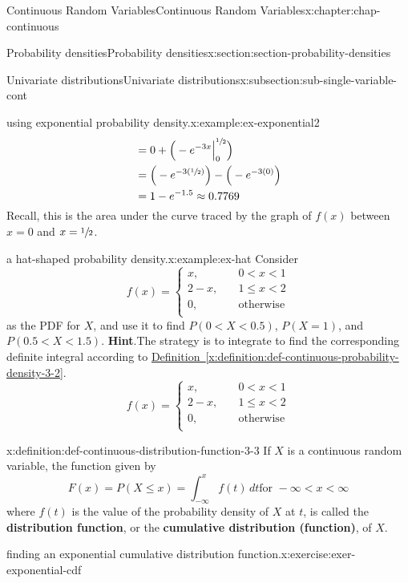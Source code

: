 \documentclass[oneside,10pt,]{book}
\newcommand{\blocktitlefont}{\relax}
\newcommand{\xreffont}{\relax}
\newcommand{\terminology}[1]{\textbf{#1}}
\numberwithin{equation}{section}
\newcommand{\lt}{<}
\newcommand{\amp}{&}
\begin{document}
\begin{chapterptx}{Continuous Random Variables}{}{Continuous Random Variables}{}{}{x:chapter:chap-continuous}
\begin{sectionptx}{Probability densities}{}{Probability densities}{}{}{x:section:section-probability-densities}
\begin{subsectionptx}{Univariate distributions}{}{Univariate distributions}{}{}{x:subsection:sub-single-variable-cont}
\begin{example}{using exponential probability density.}{x:example:ex-exponential2}
\begin{equation*}
\begin{aligned}[t]
\amp = 0 + \Big(-e^{-3x}\Big|_0^{\sfrac{1}{2}}\Big) \\
\amp = \Big(-e^{-3(\sfrac{1}{2})}\Big) - \Big(-e^{-3(0)}\Big) \\
\amp = 1- e^{-1.5} \approx 0.7769
\end{aligned}
\end{equation*}
Recall, this is the area under the curve traced by the graph of \(f(x)\) between \(x=0\) and \(x=\sfrac{1}{2}\).%
\end{example}
\begin{example}{a hat-shaped probability density.}{x:example:ex-hat}%
Consider%
\begin{equation*}
f(x) = \begin{cases}x,
\amp \quad 0 \lt x \lt 1\\
2-x, \amp \quad 1 \le x \lt 2\\
0, \amp \quad \text{otherwise}\\
\end{cases}
\end{equation*}
as the PDF for \(X\), and use it to find \(P(0 \lt X \lt 0.5)\), \(P(X=1)\), and \(P(0.5 \lt X \lt
1.5)\).%
\textbf{\blocktitlefont Hint}.\quad{}The strategy is to integrate to find the corresponding definite integral according to \hyperref[x:definition:def-continuous-probability-density-3-2]{Definition~{\xreffont\ref{x:definition:def-continuous-probability-density-3-2}}}.%
\begin{equation*}
f(x) = \begin{cases}x,
\amp \quad 0 \lt x \lt 1\\
2-x, \amp \quad 1 \le x \lt 2\\
0, \amp \quad \text{otherwise}\\
\end{cases}
\end{equation*}
%
\end{example}
\begin{definition}{}{x:definition:def-continuous-distribution-function-3-3}%
If \(X\) is a continuous random variable, the function given by%
\begin{equation*}
\displaystyle F(x) = P(X \le x) = \int_{-\infty}^x f(t) \,dt \text{
for } -\infty \lt x
\lt \infty
\end{equation*}
where \(f(t)\) is the value of the probability density of \(X\) at \(t\), is called the \terminology{distribution function}, or the \terminology{cumulative distribution (function)}, of \(X\).%
\end{definition}
\begin{inlineexercise}{finding an exponential cumulative distribution function.}{x:exercise:exer-exponential-cdf}%

\end{inlineexercise}
\end{subsectionptx}
\end{sectionptx}
\end{chapterptx}
\end{document}
